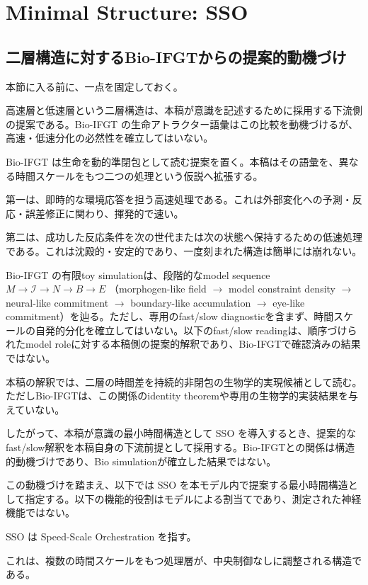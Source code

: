 \section{Minimal Structure: SSO}


\subsection{二層構造に対するBio-IFGTからの提案的動機づけ}

本節に入る前に、一点を固定しておく。

高速層と低速層という二層構造は、本稿が意識を記述するために採用する下流側の提案である。Bio-IFGT の生命アトラクター語彙はこの比較を動機づけるが、高速・低速分化の必然性を確立してはいない。

Bio-IFGT は生命を動的準閉包として読む提案を置く。本稿はその語彙を、異なる時間スケールをもつ二つの処理という仮説へ拡張する。

第一は、即時的な環境応答を担う高速処理である。これは外部変化への予測・反応・誤差修正に関わり、揮発的で速い。

第二は、成功した反応条件を次の世代または次の状態へ保持するための低速処理である。これは沈殿的・安定的であり、一度刻まれた構造は簡単には崩れない。

Bio-IFGT の有限toy simulationは、段階的なmodel sequence
$M \rightarrow \mathcal{I} \rightarrow N \rightarrow B \rightarrow E$
（morphogen-like field $\rightarrow$ model constraint density $\rightarrow$ neural-like commitment $\rightarrow$ boundary-like accumulation $\rightarrow$ eye-like commitment）を辿る。ただし、専用のfast/slow diagnosticを含まず、時間スケールの自発的分化を確立してはいない。以下のfast/slow readingは、順序づけられたmodel roleに対する本稿側の提案的解釈であり、Bio-IFGTで確認済みの結果ではない。

本稿の解釈では、二層の時間差を持続的非閉包の生物学的実現候補として読む。ただしBio-IFGTは、この関係のidentity theoremや専用の生物学的実装結果を与えていない。

したがって、本稿が意識の最小時間構造として SSO を導入するとき、提案的なfast/slow解釈を本稿自身の下流前提として採用する。Bio-IFGTとの関係は構造的動機づけであり、Bio simulationが確立した結果ではない。

この動機づけを踏まえ、以下では SSO を本モデル内で提案する最小時間構造として指定する。以下の機能的役割はモデルによる割当てであり、測定された神経機能ではない。

SSO は Speed-Scale Orchestration を指す。

これは、複数の時間スケールをもつ処理層が、中央制御なしに調整される構造である。


